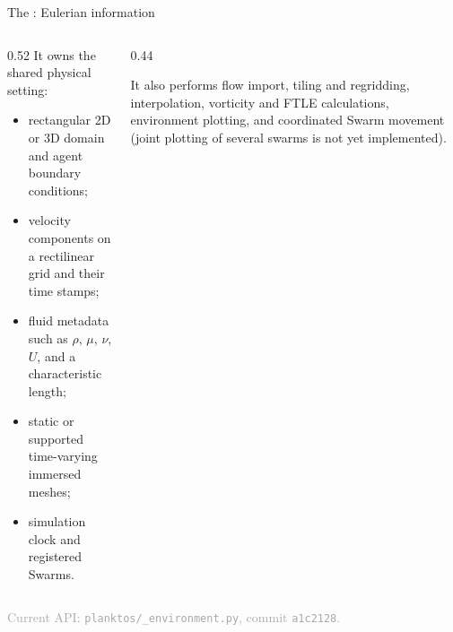 \documentclass[aspectratio=169,11pt]{beamer}
\newcommand{\sourcecredit}[1]{\vfill\hfill{\tiny\textcolor{DarkGray}{#1}}}
\newcommand{\code}[1]{\texttt{#1}}
\begin{document}
\begin{frame}{The \NoCaseChange{\code{Environment}}: Eulerian information}
\begin{columns}[T,onlytextwidth]
  \begin{column}{0.52\textwidth}
    It owns the shared physical setting:
    \begin{itemize}
      \item rectangular 2D or 3D domain and agent boundary conditions;
      \item velocity components on a rectilinear grid and their time stamps;
      \item fluid metadata such as $\rho$, $\mu$, $\nu$, $U$, and a characteristic length;
      \item static or supported time-varying immersed meshes;
      \item simulation clock and registered Swarms.
    \end{itemize}
  \end{column}
  \begin{column}{0.44\textwidth}
    \begin{block}{It also performs}
      flow import, tiling and regridding, interpolation, vorticity and FTLE calculations, environment plotting, and coordinated Swarm movement (joint plotting of several swarms is not yet implemented).
    \end{block}
  \end{column}
\end{columns}
\sourcecredit{Current API: \code{planktos/\_environment.py}, commit \code{a1c2128}.}
\end{frame}
\end{document}
